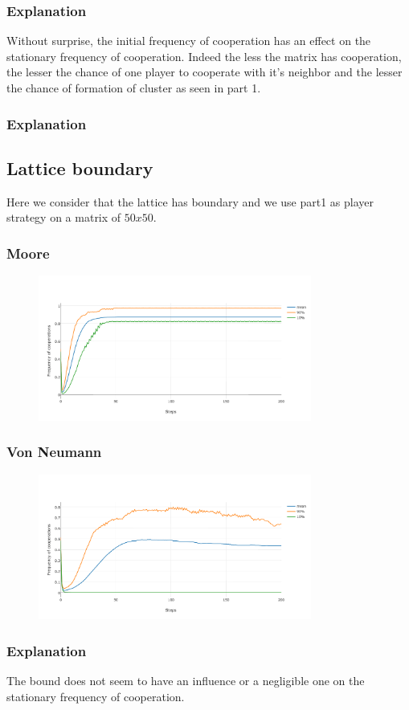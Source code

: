 \documentclass[11pt]{article}
\begin{document}
\subsubsection{Explanation}

Without surprise, the initial frequency of cooperation has an effect on the stationary frequency of cooperation. Indeed the less the matrix has cooperation, the lesser the chance of one player to cooperate with it's neighbor and the lesser the chance of formation of cluster as seen in part 1.

\subsubsection{Explanation}


\subsection{Lattice boundary}

Here we consider that the lattice has boundary and we use part1 as player strategy on a matrix of $50x50$.

\subsubsection{Moore}

\begin{figure}[H]
\centering
   \includegraphics[width=0.8\textwidth]{img/part3/moore-bounded.png}
\end{figure}

\subsubsection{Von Neumann}

\begin{figure}[H]
\centering
   \includegraphics[width=0.8\textwidth]{img/part3/von-neuman-bouded.png}
\end{figure}

\subsubsection{Explanation}

The bound does not seem to have an influence or a negligible one on the stationary frequency of cooperation.
\end{document}
